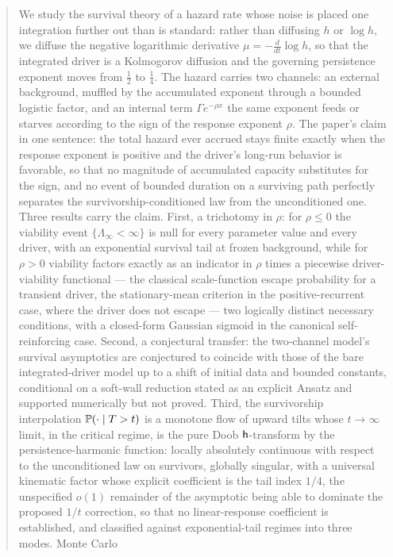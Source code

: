 \begin{abstract}
We study the survival theory of a hazard rate whose noise is placed one
integration further out than is standard: rather than diffusing $h$ or
$\log h$, we diffuse the negative logarithmic derivative
$\mu=-\frac{d}{dt}\log h$, so that the integrated driver is a
Kolmogorov diffusion and the governing persistence exponent moves from
$\tfrac12$ to $\tfrac14$. The hazard carries two channels: an external
background, muffled by the accumulated exponent through a bounded
logistic factor, and an internal term $\Gamma e^{-\rho x}$ the same
exponent feeds or starves according to the sign of the response
exponent $\rho$. The paper's claim in one sentence: the
total hazard ever accrued stays finite exactly when the response
exponent is positive and the driver's long-run behavior is favorable,
so that no magnitude of accumulated capacity substitutes for the sign,
and no event of bounded duration on a surviving path
perfectly separates the survivorship-conditioned law from the
unconditioned one. Three results carry the claim. First, a
trichotomy in $\rho$: for $\rho\le0$ the viability event
$\{\Lambda_\infty<\infty\}$ is null for every parameter value and every
driver, with an exponential survival tail at frozen background, while
for $\rho>0$ viability factors exactly as an indicator in $\rho$ times
a piecewise driver-viability functional --- the classical
scale-function escape probability for a transient driver, the
stationary-mean criterion in the positive-recurrent case, where the
driver does not escape ---
two logically distinct necessary conditions, with a closed-form Gaussian
sigmoid in the canonical self-reinforcing case. Second, a conjectural transfer: the two-channel model's survival asymptotics are conjectured to coincide with those of the bare integrated-driver model up to a shift of initial data and bounded constants, conditional on a soft-wall reduction stated as an explicit Ansatz and supported numerically but not proved. Third, the survivorship
interpolation $\PP(\cdot\mid T>t)$ is a monotone flow of upward tilts
whose $t\to\infty$ limit, in the critical regime, is the pure Doob
$\hm$-transform by the persistence-harmonic function: locally
absolutely continuous with respect to the unconditioned law on
survivors, globally singular, with a universal kinematic factor whose explicit coefficient is the tail index $1/4$, the unspecified $o(1)$ remainder of the asymptotic being able to dominate the proposed $1/t$ correction, so that no linear-response coefficient is established, and classified
against exponential-tail regimes into three modes. Monte Carlo

\end{abstract}
